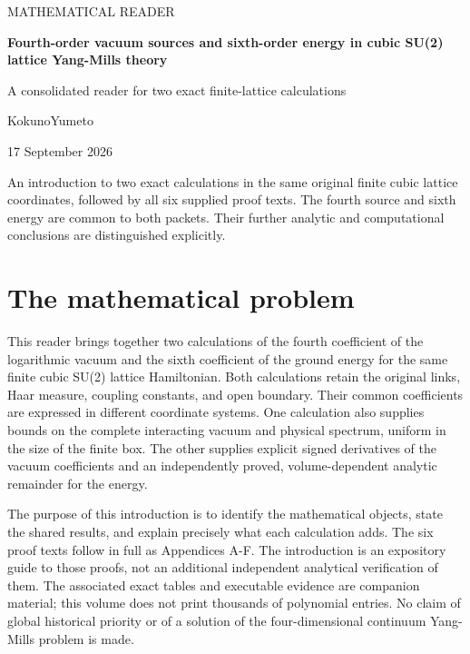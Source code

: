 \documentclass[11pt,a4paper]{article}
\let\originalsection\section
\renewcommand{\section}{\clearpage\originalsection}
\renewcommand{\[}{\begingroup\small\originaldisplaystart}
\renewcommand{\]}{\originaldisplayend\endgroup}
\begin{document}
\begin{titlepage}
\vspace*{20mm}
{\sffamily\Large MATHEMATICAL READER\par}
\vspace{12mm}
{\LARGE\bfseries Fourth-order vacuum sources and sixth-order energy in
cubic SU(2) lattice Yang-Mills theory\par}
\vspace{9mm}
{\large A consolidated reader for two exact finite-lattice
calculations\par}
\vspace{15mm}
{\large KokunoYumeto\par}
\vspace{3mm}
{17 September 2026\par}
\vfill
\begin{minipage}{0.94\textwidth}
An introduction to two exact calculations in the same original finite cubic lattice coordinates, followed by all six supplied proof texts. The fourth source and sixth energy are common to both packets. Their further analytic and computational conclusions are distinguished explicitly.
\end{minipage}
\vspace{12mm}
\end{titlepage}
\tableofcontents
\clearpage
{}
\section{The mathematical problem}\label{the-mathematical-problem}

This reader brings together two calculations of the fourth coefficient
of the logarithmic vacuum and the sixth coefficient of the ground energy
for the same finite cubic SU(2) lattice Hamiltonian. Both calculations
retain the original links, Haar measure, coupling constants, and open
boundary. Their common coefficients are expressed in different
coordinate systems. One calculation also supplies bounds on the complete
interacting vacuum and physical spectrum, uniform in the size of the
finite box. The other supplies explicit signed derivatives of the vacuum
coefficients and an independently proved, volume-dependent analytic
remainder for the energy.

The purpose of this introduction is to identify the mathematical
objects, state the shared results, and explain precisely what each
calculation adds. The six proof texts follow in full as Appendices A-F.
The introduction is an expository guide to those proofs, not an
additional independent analytical verification of them. The associated
exact tables and executable evidence are companion material; this volume
does not print thousands of polynomial entries. No claim of global
historical priority or of a solution of the four-dimensional continuum
Yang-Mills problem is made.
\end{document}
